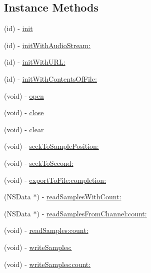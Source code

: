 \subsection*{Instance Methods}
\begin{DoxyCompactItemize}
\item 
(id) -\/ \hyperlink{interface_s_e_audio_stream_adfb80527c355e64279d60a7b1af838ea}{init}
\item 
(id) -\/ \hyperlink{interface_s_e_audio_stream_a34663b1bbae1fdb5e32111a6629a994a}{init\-With\-Audio\-Stream\-:}
\item 
(id) -\/ \hyperlink{interface_s_e_audio_stream_a7acd0370d5f5066a6d00834af0eea200}{init\-With\-U\-R\-L\-:}
\item 
(id) -\/ \hyperlink{interface_s_e_audio_stream_a88b28dfe93892a08d261bd946beea26f}{init\-With\-Contents\-Of\-File\-:}
\item 
(void) -\/ \hyperlink{interface_s_e_audio_stream_add81dd9d9bd838f3a5dc1ceae94ccf26}{open}
\item 
(void) -\/ \hyperlink{interface_s_e_audio_stream_a8c4af367964e8be4817df12989f06d40}{close}
\item 
(void) -\/ \hyperlink{interface_s_e_audio_stream_ae59699f3f9cdf5fa000d9835da89e73e}{clear}
\item 
(void) -\/ \hyperlink{interface_s_e_audio_stream_a1dd26e76fbcd65f2d221f61de75fd3eb}{seek\-To\-Sample\-Position\-:}
\item 
(void) -\/ \hyperlink{interface_s_e_audio_stream_a720083efde7839f0a44ec7456805ffeb}{seek\-To\-Second\-:}
\item 
(void) -\/ \hyperlink{interface_s_e_audio_stream_aa20244d64005b2e198eb72f99d6f7bee}{export\-To\-File\-:completion\-:}
\item 
(N\-S\-Data $\ast$) -\/ \hyperlink{interface_s_e_audio_stream_a8d848d7a388d38fb670eb92e3bf6566d}{read\-Samples\-With\-Count\-:}
\item 
(N\-S\-Data $\ast$) -\/ \hyperlink{interface_s_e_audio_stream_a4501c22126f23cc1cb9ecbd1d7ddda6e}{read\-Samples\-From\-Channel\-:count\-:}
\item 
(void) -\/ \hyperlink{interface_s_e_audio_stream_ac80704c916ddbac8f8309f3a6a019e80}{read\-Samples\-:count\-:}
\item 
(void) -\/ \hyperlink{interface_s_e_audio_stream_ab184f74429643065a116a8f272bf79b3}{write\-Samples\-:}
\item 
(void) -\/ \hyperlink{interface_s_e_audio_stream_af19a129d2a78172d771f2552dd97f49b}{write\-Samples\-:count\-:}
\end{DoxyCompactItemize}
